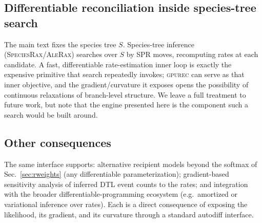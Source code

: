 \documentclass[11pt]{article}
\newcommand{\toolname}{\textsc{gpurec}\xspace}
\begin{document}
\subsection{Differentiable reconciliation inside species-tree search}
\label{app:treesearch}
The main text fixes the species tree $S$. Species-tree inference
(\textsc{SpeciesRax}/\textsc{AleRax}) searches over $S$ by SPR moves, recomputing
rates at each candidate. A fast, differentiable rate-estimation inner loop is
exactly the expensive primitive that search repeatedly invokes; \toolname can
serve as that inner objective, and the gradient/curvature it exposes opens the
possibility of continuous relaxations of branch-level structure. We leave a full
treatment to future work, but note that the engine presented here is the
component such a search would be built around.

\subsection{Other consequences}
\label{app:other}
The same interface supports: alternative recipient models beyond the softmax of
Sec.~\ref{sec:rweights} (any differentiable parameterization); gradient-based
sensitivity analysis of inferred DTL event counts to the rates; and integration
with the broader differentiable-programming ecosystem (e.g.\ amortized or
variational inference over rates). Each is a direct consequence of exposing the
likelihood, its gradient, and its curvature through a standard autodiff
interface.
\end{document}
